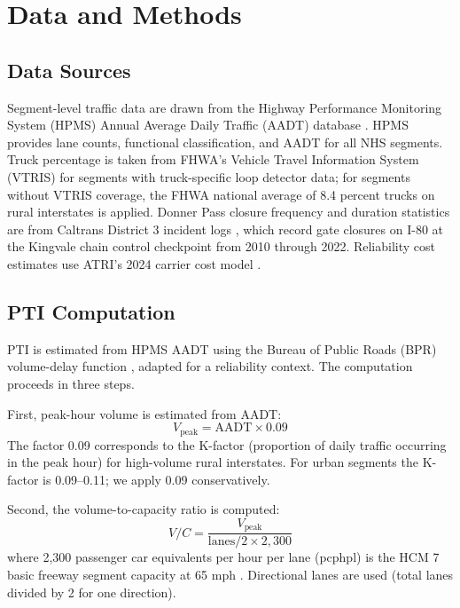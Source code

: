 \section{Data and Methods}
\label{sec:methods}

\subsection{Data Sources}

Segment-level traffic data are drawn from the Highway Performance Monitoring System (HPMS) Annual Average Daily Traffic (AADT) database \citep{HPMS2018}. HPMS provides lane counts, functional classification, and AADT for all NHS segments. Truck percentage is taken from FHWA's Vehicle Travel Information System (VTRIS) for segments with truck-specific loop detector data; for segments without VTRIS coverage, the FHWA national average of 8.4 percent trucks on rural interstates is applied. Donner Pass closure frequency and duration statistics are from Caltrans District 3 incident logs \citep{Caltrans2023}, which record gate closures on I-80 at the Kingvale chain control checkpoint from 2010 through 2022. Reliability cost estimates use ATRI's 2024 carrier cost model \citep{ATRI_costs2024}.

\subsection{PTI Computation}

PTI is estimated from HPMS AADT using the Bureau of Public Roads (BPR) volume-delay function \citep{HCM7}, adapted for a reliability context. The computation proceeds in three steps.

First, peak-hour volume is estimated from AADT:
\begin{equation}
  V_{\text{peak}} = \text{AADT} \times 0.09
  \label{eq:vpeak}
\end{equation}
The factor 0.09 corresponds to the K-factor (proportion of daily traffic occurring in the peak hour) for high-volume rural interstates. For urban segments the K-factor is 0.09--0.11; we apply 0.09 conservatively.

Second, the volume-to-capacity ratio is computed:
\begin{equation}
  V/C = \frac{V_{\text{peak}}}{\text{lanes}/2 \times 2{,}300}
  \label{eq:vc}
\end{equation}
where 2,300 passenger car equivalents per hour per lane (pcphpl) is the HCM 7 basic freeway segment capacity at 65 mph \citep{HCM7}. Directional lanes are used (total lanes divided by 2 for one direction).

